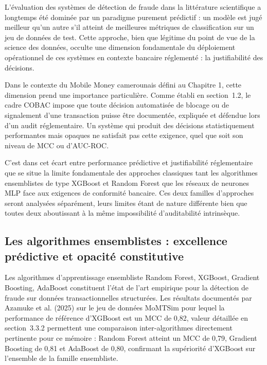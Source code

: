 \documentclass[11pt,a4paper,oneside]{report}
\theoremstyle{definition}
\theoremstyle{remark}
\begin{document}
L'évaluation des systèmes de détection de fraude dans la littérature scientifique a longtemps été dominée par un paradigme purement prédictif : un modèle est jugé meilleur qu'un autre s'il atteint de meilleures métriques de classification sur un jeu de données de test. Cette approche, bien que légitime du point de vue de la science des données, occulte une dimension fondamentale du déploiement opérationnel de ces systèmes en contexte bancaire réglementé : la justifiabilité des décisions.

Dans le contexte du Mobile Money camerounais défini au Chapitre 1, cette dimension prend une importance particulière. Comme établi en section~1.2, le cadre COBAC impose que toute décision automatisée de blocage ou de signalement d'une transaction puisse être documentée, expliquée et défendue lors d'un audit réglementaire. Un système qui produit des décisions statistiquement performantes mais opaques ne satisfait pas cette exigence, quel que soit son niveau de MCC ou d'AUC-ROC.

C'est dans cet écart entre performance prédictive et justifiabilité réglementaire que se situe la limite fondamentale des approches classiques  tant les algorithmes ensemblistes de type XGBoost et Random Forest que les réseaux de neurones MLP  face aux exigences de conformité bancaire. Ces deux familles d'approches seront analysées séparément, leurs limites étant de nature différente bien que toutes deux aboutissant à la même impossibilité d'auditabilité intrinsèque.

\subsection{Les algorithmes ensemblistes : excellence prédictive et opacité constitutive}

Les algorithmes d'apprentissage ensembliste  Random Forest, XGBoost, Gradient Boosting, AdaBoost  constituent l'état de l'art empirique pour la détection de fraude sur données transactionnelles structurées. Les résultats documentés par Azamuke et al. (2025) sur le jeu de données MoMTSim  pour lequel la performance de référence d'XGBoost est un MCC de 0,82, valeur détaillée en section~3.3.2  permettent une comparaison inter-algorithmes directement pertinente pour ce mémoire : Random Forest atteint un MCC de 0,79, Gradient Boosting de 0,81 et AdaBoost de 0,80, confirmant la supériorité d'XGBoost sur l'ensemble de la famille ensembliste.
\end{document}
